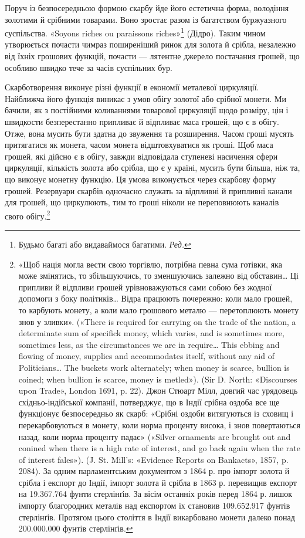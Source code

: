 Поруч із безпосередньою формою скарбу йде його естетична
форма, володіння золотими й срібними товарами. Воно зростає
разом із багатством буржуазного суспільства. «Soyons riches
ou paraissons riches»\footnote*{
Будьмо багаті або видаваймося багатими. \emph{Ред.}
} (Дідро). Таким чином утворюється почасти
чимраз поширеніший ринок для золота й срібла, незалежно від
їхніх грошових функцій, почасти — лятентне джерело постачання
грошей, що особливо швидко тече за часів суспільних бур.

Скарботворення виконує різні функції в економії металевої
циркуляції. Найближча його функція виникає з умов обігу золотої
або срібної монети. Ми бачили, як з постійними коливаннями
товарової циркуляції щодо розміру, цін і швидкости безперестанно
припливає й відпливає маса грошей, що є в обігу. Отже, вона
мусить бути здатна до звуження та розширення. Часом гроші
мусять притягатися як монета, часом монета відштовхуватися
як гроші. Щоб маса грошей, які дійсно є в обігу, завжди відповідала
ступеневі насичення сфери циркуляції, кількість золота
або срібла, що є у країні, мусить бути більша, ніж та, що виконує
монетну функцію. Ця умова виконується через скарбову
форму грошей. Резервуари скарбів одночасно служать за відпливні
й припливні канали для грошей, що циркулюють, тим то
гроші ніколи не переповнюють каналів свого обігу.\footnote{«Щоб нація могла вести свою торгівлю, потрібна певна сума
готівки, яка може змінятись, то збільшуючись, то зменшуючись залежно
від обставин\dots{} Ці припливи й відпливи грошей урівноважуються
сами собою без жодної допомоги з боку політиків\dots{} Відра працюють почережно:
коли мало грошей, то карбують монету, а коли мало грошового
металю — перетоплюють монету знов у зливки». («There is required for
carrying on the trade of the nation, a determinate sum of specifick money,
which varies, and is sometimes more, sometimes less, as the circumstances
we are in require\dots{} This ebbing and flowing of money, supplies and accommodates
itself, without any aid of Politicians\dots{} The buckets work alternately;
when money is scarce, bullion is coined; when bullion is scarce, money
is metled»). (Sir D. North: «Discourses upon Trade», London 1691, p. 22).
Джон Стюарт Мілл, довгий час урядовець східньо-індійської компанії,
потверджує, що в Індії срібна оздоба все ще функціонує безпосередньо як
скарб: «Срібні оздоби витягуються із сховищ і перекарбовуються в монету,
коли норма проценту висока, і знов повертаються назад, коли норма проценту
падає» («Silver ornaments are brought out and conined when there
is a high rate of interest, and go back agaiu when the rate of interest fales»).
(J. St. Mill’s: «Evidence Reports on Bankacts», 1857, p. 2084). За одним
парламентським документом з 1864 р. про імпорт золота й срібла і експорт
до Індії, імпорт золота й срібла в 1863 р. перевищив експорт на 19.367.764
фунти стерлінґів. За вісім останніх років перед 1864 р. лишок імпорту
благородних металів над експортом їх становив 109.652.917 фунтів стерлінґів.
Протягом цього століття в Індії викарбовано монети далеко понад
200.000.000 фунтів стерлінґів.}

